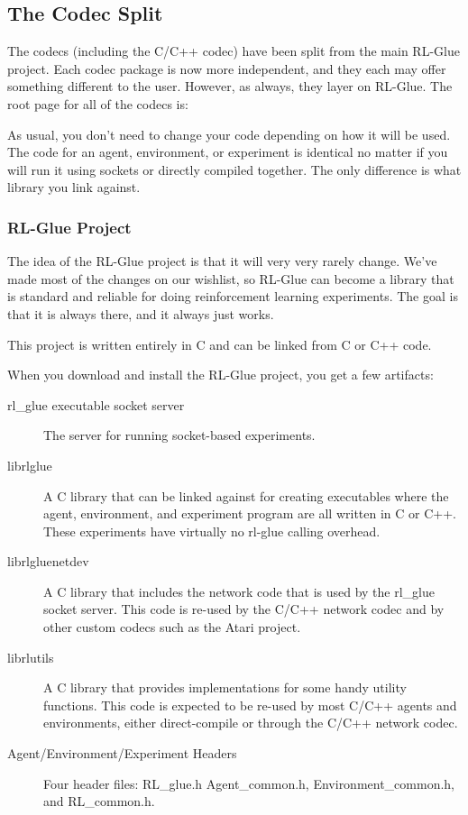 \documentclass[11pt]{article}
\begin{document}
\subsection{The Codec Split}
The codecs (including the C/C++ codec) have been split from the main RL-Glue project.  Each codec package is now more independent, and they each may offer something different to the user.  However, as always, they layer on RL-Glue.  The root page for all of the codecs is:\newline
{}

As usual, you don't need to change your code depending on how it will be used.  The code for an agent, environment, or experiment is identical no matter if you will run it using sockets or directly compiled together.  The only difference is what library you link against.

\subsubsection{RL-Glue Project}
The idea of the RL-Glue project is that it will very very rarely change.  We've made most of the changes on our wishlist, so RL-Glue can become a library that is standard and reliable for doing reinforcement learning experiments.  The goal is that it is always there, and it always just works.

This project is written entirely in C and can be linked from C or C++ code.

When you download and install the RL-Glue project, you get a few artifacts:
\begin{description}
	\item [rl\_glue executable socket server] The server for running socket-based experiments.
	\item [librlglue] A C library that can be linked against for creating executables where the agent, environment, and experiment program are all written in C or C++. These experiments have virtually no rl-glue calling overhead.
	\item [librlgluenetdev] A C library that includes the network code that is used by the rl\_glue socket server.  This code is re-used by the C/C++ network codec and by other custom codecs such as the Atari project.
	\item [librlutils] A C library that provides implementations for some handy utility functions.  This code is expected to be re-used by most C/C++ agents and environments, either direct-compile or through the C/C++ network codec.
	\item [Agent/Environment/Experiment Headers]  Four header files: RL\_glue.h Agent\_common.h, Environment\_common.h, and RL\_common.h. 
\end{description}
 
\end{document}
